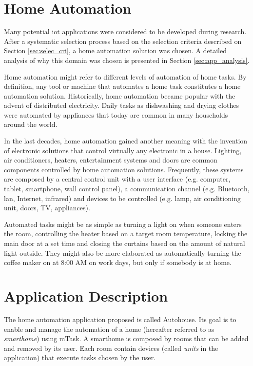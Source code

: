 \section{Home Automation}

Many potential \ac{iot} applications were considered to be developed during research. After a systematic selection process based on the selection criteria described on Section \ref{sec:selec_cri}, a home automation solution was chosen. A detailed analysis of why this domain was chosen is presented in Section \ref{sec:app_analysis}.

Home automation might refer to different levels of automation of home tasks. By definition, any tool or machine that automates a home task constitutes a home automation solution. Historically, home automation became popular with the advent of distributed electricity. Daily tasks as dishwashing and drying clothes were automated by appliances that today are common in many households around the world.

In the last decades, home automation gained another meaning with the invention of electronic solutions that control virtually any electronic in a house. Lighting, air conditioners, heaters, entertainment systems and doors are common components controlled by home automation solutions. Frequently, these systems are composed by a central control unit with a user interface (e.g. computer, tablet, smartphone, wall control panel), a communication channel (e.g. Bluetooth, \acs{lan}, Internet, infrared) and devices to be controlled (e.g. lamp, air conditioning unit, doors, TV, appliances).

Automated tasks might be as simple as turning a light on when someone enters the room, controlling the heater based on a target room temperature, locking the main door at a set time and closing the curtains based on the amount of natural light outside. They might also be more elaborated as automatically turning the coffee maker on at 8:00 AM on work days, but only if somebody is at home.

\section{Application Description}\label{sec:app_desc}

The home automation application proposed is called Autohouse. Its goal is to enable and manage the automation of a home (hereafter referred to as \textit{smarthome}) using \gls{mTask}. A smarthome is composed by rooms that can be added and removed by its user. Each room contain devices (called \textit{units} in the application) that execute tasks chosen by the user. 

